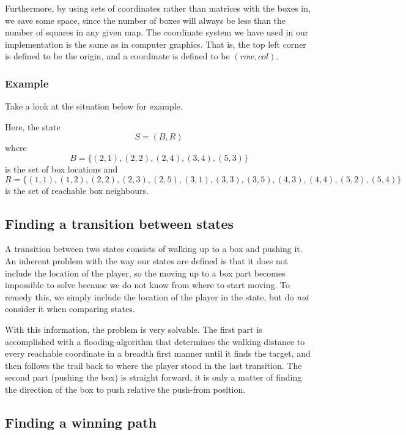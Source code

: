 \documentclass[a4paper,11pt]{article}
\begin{document}
Furthermore, by using sets of coordinates rather than matrices with the boxes in,
we save some space, since the number of boxes will always be less than the number of squares in any
given map.
The coordinate system we have used in our implementation is the same as in computer graphics.
That is, the top left corner is defined to be the origin, and a coordinate is defined to be
$(row, col)$.

\subsubsection{Example}
Take a look at the situation below for example.


Here, the state
$$
S = (B, R)
$$
where $$B = \{(2, 1), (2,2),(2, 4), (3, 4), (5,3)\}$$
is the set of box locations and
$$R =\{(1,1), (1,2), (2,2), (2,3), (2,5), (3,1), (3,3), (3,5), (4,3), (4,4), (5,2), (5,4)\}$$
is the set of reachable box neighbours.

\subsection{Finding a transition between states}

A transition between two states consists of walking up to a box and pushing it.
An inherent problem with the way our states are defined is that it does not include the location
of the player, so the moving up to a box part becomes impossible to solve because
we do not know from where to start moving.
To remedy this, we simply include the location of the player in the state,
but do \emph{not} consider it when comparing states.

With this information, the problem is very solvable.
The first part is accomplished with a flooding-algorithm that
determines the walking distance to every reachable coordinate in a breadth
first manner until it finds the target, and then follows the trail back to
where the player stood in the last transition.
The second part (pushing the box) is straight forward, it is only a matter 
of finding the direction of the box to push relative the push-from position.

\subsection{Finding a winning path}
\end{document}
